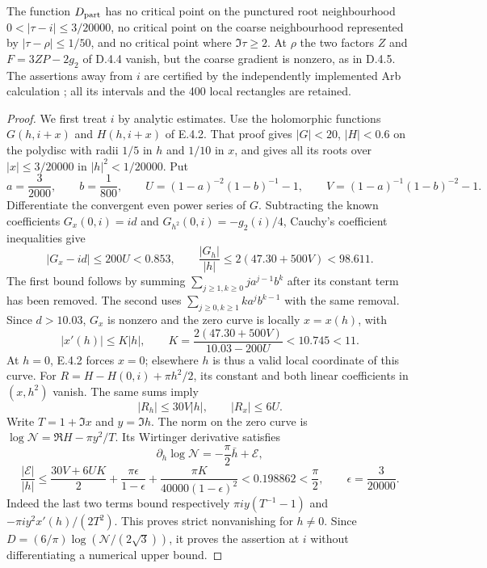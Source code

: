 \begin{proposition}\label{push:src:D.4.7}
The function $D_{\rm part}$ has no critical point on the punctured
root neighbourhood $0<|\tau-i|\leq3/20000$, no critical point on the
coarse neighbourhood represented by $|\tau-\rho|\leq1/50$, and no
critical point where $\Im\tau\geq2$. At $\rho$ the two factors
$Z$ and $F=3ZP-2g_2$ of D.4.4 vanish, but the coarse gradient is
nonzero, as in D.4.5. The assertions away from $i$ are certified by
the independently implemented Arb calculation
; all its intervals and
the 400 local rectangles are retained.
\end{proposition}
\begin{proof}
We first treat $i$ by analytic estimates. Use the holomorphic
functions $G(h,i+x)$ and $H(h,i+x)$ of E.4.2. That proof gives
$|G|<20$, $|H|<0.6$ on the polydisc with radii $1/5$ in $h$ and
$1/10$ in $x$, and gives all its roots over $|x|\leq3/20000$ in
$|h|^2<1/20000$. Put
\[
 a=\frac3{2000},\qquad b=\frac1{800},\qquad
 U=(1-a)^{-2}(1-b)^{-1}-1,\qquad
 V=(1-a)^{-1}(1-b)^{-2}-1.
\]
Differentiate the convergent even power series of $G$. Subtracting
the known coefficients $G_x(0,i)=id$ and
$G_{h^2}(0,i)=-g_2(i)/4$, Cauchy's coefficient inequalities give
\[
 |G_x-id|\leq200U<0.853,\qquad
 \frac{|G_h|}{|h|}\leq2(47.30+500V)<98.611.
\]
The first bound follows by summing
$\sum_{j\geq1,k\geq0}j a^{j-1}b^k$ after its constant term
has been removed. The second uses
$\sum_{j\geq0,k\geq1}k a^j b^{k-1}$ with the same removal.
Since $d>10.03$, $G_x$ is nonzero and the zero curve is locally
$x=x(h)$, with
\[
 |x'(h)|\leq K|h|,\qquad
 K=\frac{2(47.30+500V)}{10.03-200U}<10.745<11.
\]
At $h=0$, E.4.2 forces $x=0$; elsewhere $h$ is thus a valid local
coordinate of this curve. For
$R=H-H(0,i)+\pi h^2/2$, its constant and both linear coefficients
in $(x,h^2)$ vanish. The same sums imply
\[
 |R_h|\leq30V|h|,\qquad |R_x|\leq6U.
\]
Write $T=1+\Im x$ and $y=\Im h$. The norm on the zero curve is
$\log\mathcal N=\Re H-\pi y^2/T$. Its Wirtinger derivative satisfies
\[
 \partial_h\log\mathcal N
 =-\frac\pi2\bar h+\mathcal E,
\]
\[
 \frac{|\mathcal E|}{|h|}
 \leq\frac{30V+6UK}{2}
 +\frac{\pi\epsilon}{1-\epsilon}
 +\frac{\pi K}{40000(1-\epsilon)^2}
 <0.198862<\frac\pi2,\qquad \epsilon=\frac3{20000}.
\]
Indeed the last two terms bound respectively
$\pi i y(T^{-1}-1)$ and
$-\pi i y^2x'(h)/(2T^2)$. This proves strict nonvanishing for
$h\ne0$. Since $D=(6/\pi)\log(\mathcal N/(2\sqrt3))$, it proves
the assertion at $i$ without differentiating a numerical upper bound.


\end{proof}
